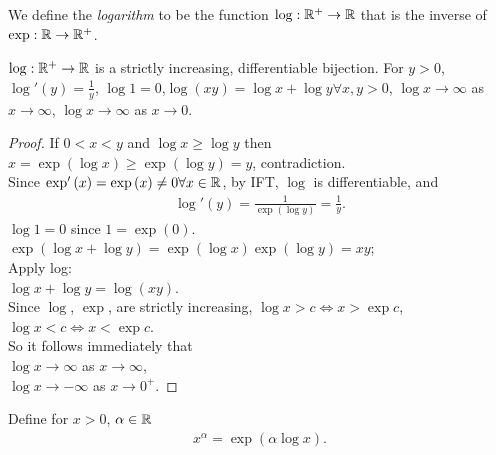 \documentclass[a4paper]{article}
\begin{document}
We define the \emph{logarithm} to be the function $\log:\mathbb{R}^+\to\mathbb{R}$ that is the inverse of $\exp:\mathbb{R}\to\mathbb{R}^+$.

\begin{thm}
$\log:\mathbb{R}^+\to\mathbb{R}$ is a strictly increasing, differentiable bijection. For $y>0$, $\log'\left(y\right)=\frac{1}{y}$, $\log1=0$,$\log\left(xy\right)=\log x+\log y \forall x,y>0$, $\log x\to\infty$ as $x\to\infty$, $\log x\to\infty$ as $x\to 0$.\\
\begin{proof}
If $0<x<y$ and $\log x\geq \log y$ then\\
$x=\exp\left(\log x\right)\geq \exp\left(\log y\right) = y$, contradiction.\\
Since $\exp'\left(x\right)=\exp\left(x\right)\neq 0 \forall x\in\mathbb{R}$, by IFT, $\log$ is differentiable, and\\
\begin{equation*}
\begin{aligned}
\log'\left(y\right)=\frac{1}{\exp\left(\log y\right)}=\frac{1}{y}.
\end{aligned}
\end{equation*}
$\log 1=0$ since $1=\exp\left(0\right)$.\\
$\exp\left(\log x+\log y\right) = \exp\left(\log x\right)\exp\left(\log y\right)=xy$;\\
Apply log:\\
$\log x+\log y = \log \left(xy\right)$.\\
Since $\log$, $\exp$, are strictly increasing, $\log x>c \iff x>\exp c$, $\log x<c \iff x<\exp c$.\\
So it follows immediately that\\
$\log x\to\infty$ as $x\to\infty$,\\
$\log x\to -\infty$ as $x\to 0^+$.
\end{proof}
\end{thm}

\begin{defi}
Define for $x>0$, $\alpha\in\mathbb{R}$
\begin{equation*}
\begin{aligned}
x^\alpha = \exp\left(\alpha \log x\right).
\end{aligned}
\end{equation*}
\end{defi}
\end{document}
